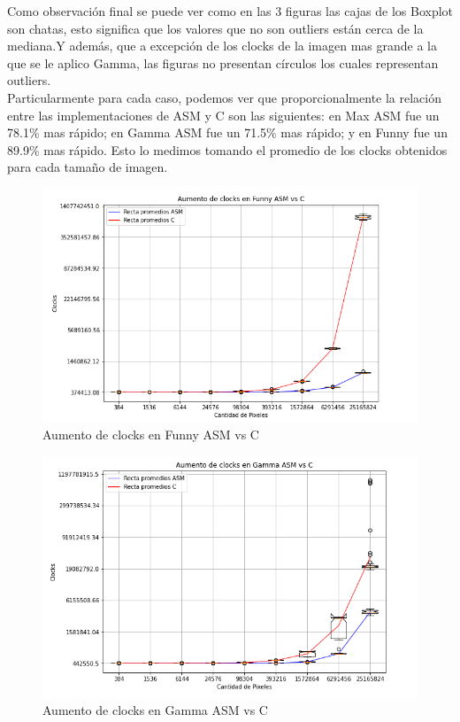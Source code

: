 \documentclass[a4paper]{article}
\begin{document}
\begin{itemize}
    Como observación final se puede ver como en las 3 figuras las cajas de los Boxplot son chatas, esto significa que los valores que no son outliers están cerca de la mediana.Y además, que a excepción de los clocks de la imagen mas grande a la que se le aplico Gamma, las figuras no presentan círculos los cuales representan outliers.
\\
    Particularmente para cada caso, podemos ver que proporcionalmente la relación entre las implementaciones de ASM y C son las siguientes: en Max ASM fue un 78.1\% mas rápido; en Gamma ASM fue un 71.5\% mas rápido; y en Funny fue un 89.9\% mas rápido. Esto lo medimos tomando el promedio de los clocks obtenidos para cada tamaño de imagen.
    
\begin{figure}[htp]
    \centering
    \includegraphics[scale=.5]{BoxplotFunnyAsmvsC.png}
    \caption{Aumento de clocks en Funny ASM vs C}
    \label{fig:galaxy}
\end{figure}

\begin{figure}[htp]
    \centering
    \includegraphics[scale=.5]{BoxPlotGammaCvsAsm.png}
    \caption{Aumento de clocks en Gamma ASM vs C}
    \label{fig:galaxy}
\end{figure}


\end{itemize}
\end{document}
